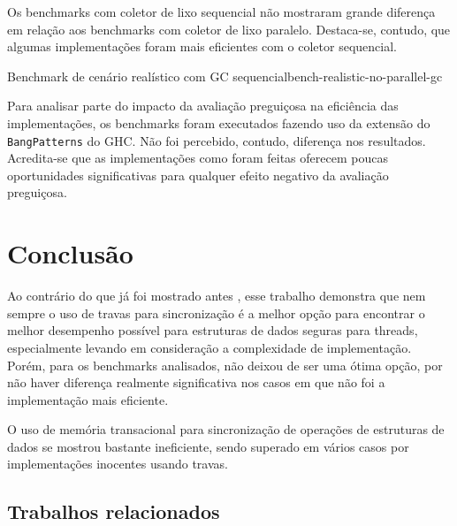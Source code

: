 \documentclass[a4paper,12pt,oldfontcommands]{abntex2}
\begin{document}
Os benchmarks com coletor de lixo sequencial não mostraram grande diferença em relação aos benchmarks com coletor de lixo paralelo. Destaca-se, contudo, que algumas implementações foram mais eficientes com o coletor sequencial.

\begin{center}
\begin{graph}{Benchmark de cenário realístico com GC sequencial}{bench-realistic-no-parallel-gc}
\begin{bchart}[step=3,max=27,unit=s,width=.9\textwidth]
        \smallskip
        \smallskip
        \smallskip
        \smallskip
        \smallskip
\end{bchart}
\end{graph}
\end{center}

Para analisar parte do impacto da avaliação preguiçosa na eficiência das implementações, os benchmarks foram executados fazendo uso da extensão do \texttt{BangPatterns} do GHC. Não foi percebido, contudo, diferença nos resultados. Acredita-se que as implementações como foram feitas oferecem poucas oportunidades significativas para qualquer efeito negativo da avaliação preguiçosa.

\chapter{Conclusão}\label{chapter-conclusion}

Ao contrário do que já foi mostrado antes \cite{sulzmann2009comparing}, esse trabalho demonstra que nem sempre o uso de travas para sincronização é a melhor opção para encontrar o melhor desempenho possível para estruturas de dados seguras para threads, especialmente levando em consideração a complexidade de implementação. Porém, para os benchmarks analisados, não deixou de ser uma ótima opção, por não haver diferença realmente significativa nos casos em que não foi a implementação mais eficiente.

O uso de memória transacional para sincronização de operações de estruturas de dados se mostrou bastante ineficiente, sendo superado em vários casos por implementações inocentes usando travas.

\section{Trabalhos relacionados}
\end{document}
